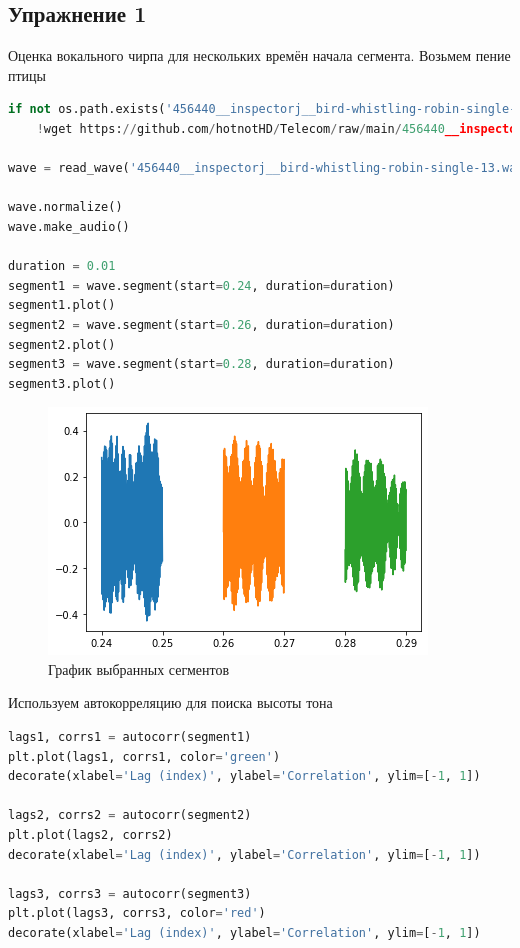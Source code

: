 \subsection{Упражнение 1}

Оценка вокального чирпа для нескольких времён начала сегмента. Возьмем пение птицы

\begin{lstlisting}[language=Python]
if not os.path.exists('456440__inspectorj__bird-whistling-robin-single-13.wav'):
    !wget https://github.com/hotnotHD/Telecom/raw/main/456440__inspectorj__bird-whistling-robin-single-13.wav

wave = read_wave('456440__inspectorj__bird-whistling-robin-single-13.wav')

wave.normalize()
wave.make_audio()

duration = 0.01
segment1 = wave.segment(start=0.24, duration=duration)
segment1.plot()
segment2 = wave.segment(start=0.26, duration=duration)
segment2.plot()
segment3 = wave.segment(start=0.28, duration=duration)
segment3.plot()
\end{lstlisting}

\begin{figure}[H]
	\begin{center}
		\includegraphics[scale=1]{fig/lab05/lab05_01.png}
		\caption{График выбранных сегментов}
	\end{center}
\end{figure}

Используем автокорреляцию для поиска высоты тона

\begin{lstlisting}[language=Python]
lags1, corrs1 = autocorr(segment1)
plt.plot(lags1, corrs1, color='green')
decorate(xlabel='Lag (index)', ylabel='Correlation', ylim=[-1, 1])

lags2, corrs2 = autocorr(segment2)
plt.plot(lags2, corrs2)
decorate(xlabel='Lag (index)', ylabel='Correlation', ylim=[-1, 1])

lags3, corrs3 = autocorr(segment3)
plt.plot(lags3, corrs3, color='red')
decorate(xlabel='Lag (index)', ylabel='Correlation', ylim=[-1, 1])
\end{lstlisting}


